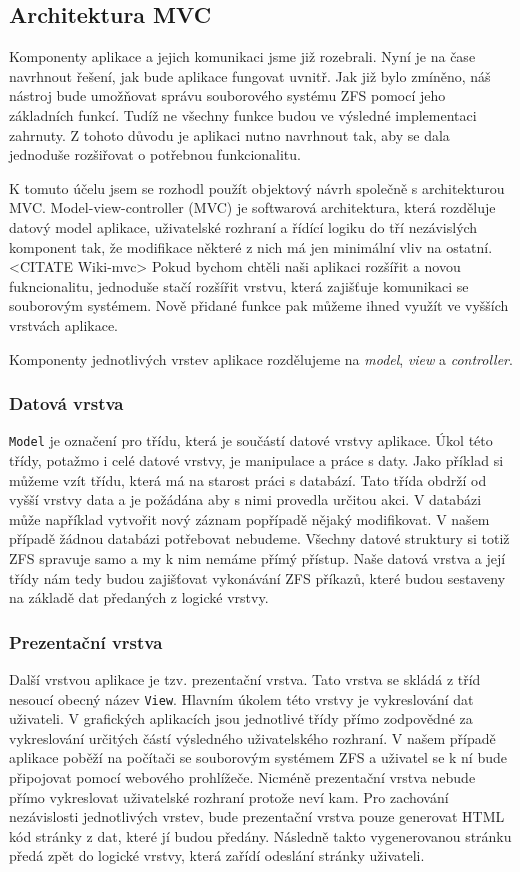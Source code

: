     \subsection{Architektura MVC}
    Komponenty aplikace a jejich komunikaci jsme již rozebrali. Nyní je na čase navrhnout řešení, jak bude aplikace fungovat uvnitř. Jak již bylo zmíněno, náš nástroj bude umožňovat správu souborového systému ZFS pomocí jeho základních funkcí. Tudíž ne všechny funkce budou ve výsledné implementaci zahrnuty. Z tohoto důvodu je aplikaci nutno navrhnout tak, aby se dala jednoduše rozšiřovat o potřebnou funkcionalitu.

    K tomuto účelu jsem se rozhodl použít objektový návrh společně s architekturou MVC. Model-view-controller (MVC) je softwarová architektura, která rozděluje datový model aplikace, uživatelské rozhraní a řídící logiku do tří nezávislých komponent tak, že modifikace některé z nich má jen minimální vliv na ostatní.<CITATE Wiki-mvc> Pokud bychom chtěli naši aplikaci rozšířit a novou fukncionalitu, jednoduše stačí rozšířit vrstvu, která zajišťuje komunikaci se souborovým systémem. Nově přidané funkce pak můžeme ihned využít ve vyšších vrstvách aplikace.

    Komponenty jednotlivých vrstev aplikace rozdělujeme na \emph{model}, \emph{view} a \emph{controller}.

        \subsubsection{Datová vrstva}
        \verb|Model| je označení pro třídu, která je součástí datové vrstvy aplikace. Úkol této třídy, potažmo i celé datové vrstvy, je manipulace a práce s daty. Jako příklad si můžeme vzít třídu, která má na starost práci s databází. Tato třída obdrží od vyšší vrstvy data a je požádána aby s nimi provedla určitou akci. V databázi může například vytvořit nový záznam popřípadě nějaký modifikovat. V našem případě žádnou databázi potřebovat nebudeme. Všechny datové struktury si totiž ZFS spravuje samo a my k nim nemáme přímý přístup. Naše datová vrstva a její třídy nám tedy budou zajišťovat vykonávání ZFS příkazů, které budou sestaveny na základě dat předaných z logické vrstvy.
        \subsubsection{Prezentační vrstva}
        Další vrstvou aplikace je tzv. prezentační vrstva. Tato vrstva se skládá z tříd nesoucí obecný název \verb|View|. Hlavním úkolem této vrstvy je vykreslování dat uživateli. V grafických aplikacích jsou jednotlivé třídy přímo zodpovědné za vykreslování určitých částí výsledného uživatelského rozhraní. V našem případě aplikace poběží na počítači se souborovým systémem ZFS a uživatel se k ní bude připojovat pomocí webového prohlížeče. Nicméně prezentační vrstva nebude přímo vykreslovat uživatelské rozhraní protože neví kam. Pro zachování nezávislosti jednotlivých vrstev, bude prezentační vrstva pouze generovat HTML kód stránky z dat, které jí budou předány. Následně takto vygenerovanou stránku předá zpět do logické vrstvy, která zařídí odeslání stránky uživateli.
